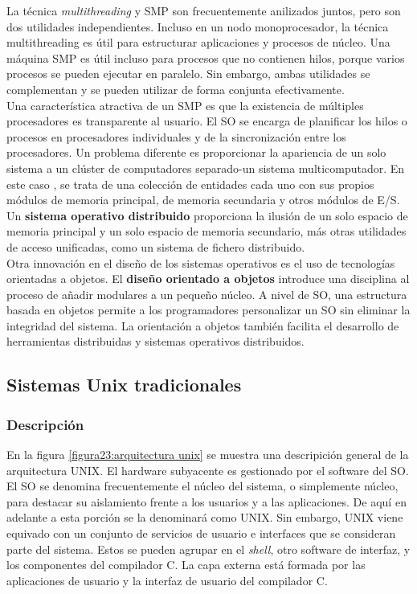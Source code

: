 \documentclass{article}
\begin{document}
			La técnica \textit{multithreading} y SMP son frecuentemente anilizados juntos, pero son dos utilidades independientes. Incluso en un nodo monoprocesador, la técnica multithreading es útil para estructurar aplicaciones y procesos de núcleo. Una máquina SMP es útil incluso para procesos que no contienen hilos, porque varios procesos se pueden ejecutar en paralelo. Sin embargo, ambas utilidades se complementan y se pueden utilizar de forma conjunta efectivamente. \\
			
			Una característica atractiva de un SMP es que la existencia de múltiples procesadores es transparente al usuario. El SO se encarga de planificar los hilos o procesos en procesadores individuales y de la sincronización entre los procesadores. Un problema diferente es proporcionar la apariencia de un solo sistema a un clúster de computadores separado-un sistema multicomputador. En este caso , se trata de una colección de entidades cada uno con sus propios módulos de memoria principal, de memoria secundaria y otros módulos de E/S. \\
			
			Un \textbf{sistema operativo distribuido} proporciona la ilusión de un solo espacio de memoria principal y un solo espacio de memoria secundario, más otras utilidades de acceso unificadas, como un sistema de fichero distribuido. \\
			
			Otra innovación en el diseño de los sistemas operativos es el uso de tecnologías orientadas a objetos. El \textbf{diseño orientado a objetos} introduce una disciplina al proceso de añadir modulares a un pequeño núcleo. A nivel de SO, una estructura basada en objetos permite a los programadores personalizar un SO sin eliminar la integridad del sistema. La orientación a objetos también facilita el desarrollo de herramientas distribuidas y sistemas operativos distribuidos.
			
		\subsection{Sistemas Unix tradicionales}
			\subsubsection{Descripción}
				En la figura \ref{figura23:arquitectura unix} se muestra una descripición general de la arquitectura UNIX. El hardware subyacente es gestionado por el software del SO. El SO se denomina frecuentemente el núcleo del sistema, o simplemente núcleo, para destacar su aislamiento frente a los usuarios y a las aplicaciones. De aquí en adelante a esta porción se la denominará como UNIX. Sin embargo, UNIX viene equivado con un conjunto de servicios de usuario e interfaces que se consideran parte del sistema. Estos se pueden agrupar en el \textit{shell}, otro software de interfaz, y los componentes del compilador C. La capa externa está formada por las aplicaciones de usuario y la interfaz de usuario del compilador C. \\
				
\end{document}
